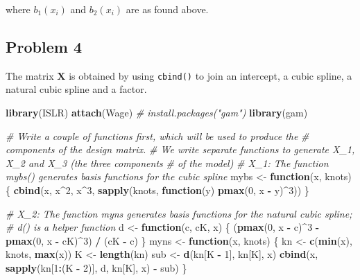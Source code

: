\documentclass[
]{article}
\newenvironment{Shaded}{\begin{snugshade}}{\end{snugshade}}
\newcommand{\CommentTok}[1]{\textcolor[rgb]{0.56,0.35,0.01}{\textit{#1}}}
\newcommand{\ControlFlowTok}[1]{\textcolor[rgb]{0.13,0.29,0.53}{\textbf{#1}}}
\newcommand{\DecValTok}[1]{\textcolor[rgb]{0.00,0.00,0.81}{#1}}
\newcommand{\FunctionTok}[1]{\textcolor[rgb]{0.13,0.29,0.53}{\textbf{#1}}}
\newcommand{\NormalTok}[1]{#1}
\newcommand{\OtherTok}[1]{\textcolor[rgb]{0.56,0.35,0.01}{#1}}
\newcommand{\SpecialCharTok}[1]{\textcolor[rgb]{0.81,0.36,0.00}{\textbf{#1}}}
\begin{document}
where \(b_1(x_i)\) and \(b_2(x_i)\) are as found above.

\subsection{Problem 4}\label{problem-4}

The matrix \(\mathbf X\) is obtained by using \texttt{cbind()} to join
an intercept, a cubic spline, a natural cubic spline and a factor.

\begin{Shaded}
\begin{Highlighting}[]
\FunctionTok{library}\NormalTok{(ISLR)}
\FunctionTok{attach}\NormalTok{(Wage)}
\CommentTok{\# install.packages("gam")}
\FunctionTok{library}\NormalTok{(gam)}

\CommentTok{\# Write a couple of functions first, which will be used to produce the }
\CommentTok{\# components of the design matrix.}
\CommentTok{\# We write separate functions to generate X\_1, X\_2 and X\_3 (the three components}
\CommentTok{\# of the model)}
\CommentTok{\# X\_1: The function mybs() generates basis functions for the cubic spline}
\NormalTok{mybs }\OtherTok{\textless{}{-}} \ControlFlowTok{function}\NormalTok{(x, knots) \{}
  \FunctionTok{cbind}\NormalTok{(x, x}\SpecialCharTok{\^{}}\DecValTok{2}\NormalTok{, x}\SpecialCharTok{\^{}}\DecValTok{3}\NormalTok{, }\FunctionTok{sapply}\NormalTok{(knots, }\ControlFlowTok{function}\NormalTok{(y) }\FunctionTok{pmax}\NormalTok{(}\DecValTok{0}\NormalTok{, x }\SpecialCharTok{{-}}\NormalTok{ y)}\SpecialCharTok{\^{}}\DecValTok{3}\NormalTok{))}
\NormalTok{\} }

\CommentTok{\# X\_2: The function myns generates basis functions for the natural cubic spline;}
\CommentTok{\# d() is a helper function}
\NormalTok{d }\OtherTok{\textless{}{-}} \ControlFlowTok{function}\NormalTok{(c, cK, x) \{}
\NormalTok{  (}\FunctionTok{pmax}\NormalTok{(}\DecValTok{0}\NormalTok{, x }\SpecialCharTok{{-}}\NormalTok{ c)}\SpecialCharTok{\^{}}\DecValTok{3} \SpecialCharTok{{-}} \FunctionTok{pmax}\NormalTok{(}\DecValTok{0}\NormalTok{, x }\SpecialCharTok{{-}}\NormalTok{ cK)}\SpecialCharTok{\^{}}\DecValTok{3}\NormalTok{) }\SpecialCharTok{/}\NormalTok{ (cK }\SpecialCharTok{{-}}\NormalTok{ c)}
\NormalTok{\}}
\NormalTok{myns }\OtherTok{\textless{}{-}} \ControlFlowTok{function}\NormalTok{(x, knots) \{}
\NormalTok{  kn }\OtherTok{\textless{}{-}} \FunctionTok{c}\NormalTok{(}\FunctionTok{min}\NormalTok{(x), knots, }\FunctionTok{max}\NormalTok{(x))}
\NormalTok{  K }\OtherTok{\textless{}{-}} \FunctionTok{length}\NormalTok{(kn)}
\NormalTok{  sub }\OtherTok{\textless{}{-}} \FunctionTok{d}\NormalTok{(kn[K }\SpecialCharTok{{-}} \DecValTok{1}\NormalTok{], kn[K], x)}
  \FunctionTok{cbind}\NormalTok{(x, }\FunctionTok{sapply}\NormalTok{(kn[}\DecValTok{1}\SpecialCharTok{:}\NormalTok{(K }\SpecialCharTok{{-}} \DecValTok{2}\NormalTok{)], d, kn[K], x) }\SpecialCharTok{{-}}\NormalTok{ sub)}
\NormalTok{\}}


\end{Highlighting}
\end{Shaded}
\end{document}
